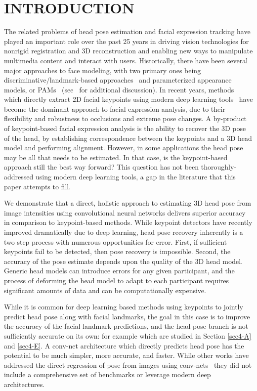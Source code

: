 \documentclass[10pt,twocolumn,letterpaper]{article}
\begin{document}
\section{INTRODUCTION}\label{sec1}
The related problems of head pose estimation and facial expression tracking have played an important role over the past 25 years in driving vision technologies for nonrigid registration and 3D reconstruction and enabling new ways to manipulate multimedia content and interact with users. Historically, there have been several major approaches to face modeling, with two primary ones being discriminative/landmark-based approaches~\cite{saragih2011deformable,Zhu2012} and parameterized appearance models, or PAMs~\cite{Cootes2001,Matthews2004} (see~\cite{Xiong2013} for additional discussion). In recent years, methods which directly extract 2D facial keypoints using modern deep learning tools~\cite{bulat2017far,zhu2016face,KEPLER} have become the dominant approach to facial expression analysis, due to their flexibility and robustness to occlusions and extreme pose changes. A by-product of keypoint-based facial expression analysis is the ability to recover the 3D pose of the head, by establishing correspondence between the keypoints and a 3D head model and performing alignment. However, in some applications the head pose may be all that needs to be estimated. In that case, is the keypoint-based approach still the best way forward? This question has not been thoroughly-addressed using modern deep learning tools, a gap in the literature that this paper attempts to fill.

We demonstrate that a direct, holistic approach to estimating 3D head pose from image intensities using convolutional neural networks delivers superior accuracy in comparison to keypoint-based methods. While keypoint detectors have recently improved dramatically due to deep learning, head pose recovery inherently is a two step process with numerous opportunities for error. First, if sufficient keypoints fail to be detected, then pose recovery is impossible. Second, the accuracy of the pose estimate depends upon the quality of the 3D head model. Generic head models can introduce errors for any given participant, and the process of deforming the head model to adapt to each participant requires significant amounts of data and can be computationally expensive.

While it is common for deep learning based methods using keypoints to jointly predict head pose along with facial landmarks, the goal in this case is to improve the accuracy of the facial landmark predictions, and the head pose branch is not sufficiently accurate on its own: for example \cite{KEPLER, ranjan2016hyperface, allinone} which are studied in Section \ref{sec4-A} and \ref{sec4-E}. A conv-net architecture which directly predicts head pose has the potential to be much simpler, more accurate, and faster. While other works have addressed the direct regression of pose from images using conv-nets~\cite{BMVC2015_130,patacchiola2017head,chang2017faceposenet} they did not include a comprehensive set of benchmarks or leverage modern deep architectures.
\end{document}
